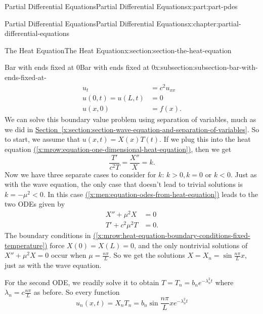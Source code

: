 \documentclass[twoside,10pt,]{book}
\newcommand{\xreffont}{\relax}
\numberwithin{equation}{part}
\newcommand{\lt}{<}
\newcommand{\gt}{>}
\newcommand{\amp}{&}
\begin{document}
\begin{partptx}{Partial Differential Equations}{}{Partial Differential Equations}{}{}{x:part:part-pdes}
\begin{chapterptx}{Partial Differential Equations}{}{Partial Differential Equations}{}{}{x:chapter:partial-differential-equations}
\begin{sectionptx}{The Heat Equation}{}{The Heat Equation}{}{}{x:section:section-the-heat-equation}
\begin{subsectionptx}{Bar with ends fixed at \(0\)}{}{Bar with ends fixed at \(0\)}{}{}{x:subsection:subsection-bar-with-ends-fixed-at-}
%
\begin{align}
u_{t} \amp = c^{2}u_{xx} \label{x:mrow:equation-one-dimensional-heat-equation}\\
u(0,t) = u(L,t) \amp = 0 \label{x:mrow:heat-equation-boundary-conditions-fixed-temperature}\\
u(x,0) \amp = f(x) \text{.}\label{x:mrow:heat-equation-initial-condition}
\end{align}
We can solve this boundary value problem using separation of variables, much as we did in \hyperref[x:section:section-wave-equation-and-separation-of-variables]{Section~{\xreffont\ref{x:section:section-wave-equation-and-separation-of-variables}}}. So to start, we assume that \(u(x,t) = X(x)T(t)\). If we plug this into the heat equation \hyperref[x:mrow:equation-one-dimensional-heat-equation]{({\xreffont\ref{x:mrow:equation-one-dimensional-heat-equation}})}, then we get%
%
\begin{equation}
\frac{T'}{c^{2}T} = \frac{X''}{X} = k.\label{x:men:equation-odes-from-heat-equation}
\end{equation}
Now we have three separate cases to consider for \(k\): \(k\gt0, k=0\) or \(k\lt0\). Just as with the wave equation, the only case that doesn't lead to trivial solutions is \(k=-\mu^{2}\lt0\). In this case \hyperref[x:men:equation-odes-from-heat-equation]{({\xreffont\ref{x:men:equation-odes-from-heat-equation}})} leads to the two ODEs given by%
%
\begin{align*}
X''+\mu^{2}X \amp = 0 \\
T'+c^{2}\mu^{2}T \amp = 0 \text{.}
\end{align*}
The boundary conditions in \hyperref[x:mrow:heat-equation-boundary-conditions-fixed-temperature]{({\xreffont\ref{x:mrow:heat-equation-boundary-conditions-fixed-temperature}})} force \(X(0) = X(L) = 0\), and the only nontrivial solutions of \(X''+\mu^{2}X = 0\) occur when \(\mu = \frac{n\pi}{L}\). So we get the solutions \(X = X_{n} = \sin\frac{n\pi}{L}x\), just as with the wave equation.%
\par
For the second ODE, we readily solve it to obtain \(T = T_{n} = b_{n}e^{-\lambda_{n}^{2}t}\) where \(\lambda_{n} = c\frac{n\pi}{L}\) as before. So every function%
\begin{equation*}
u_{n}(x,t) = X_{n}T_{n} = b_{n}\sin\frac{n\pi}{L}xe^{-\lambda_{n}^{2}t}
\end{equation*}

\end{subsectionptx}
\end{sectionptx}
\end{chapterptx}
\end{partptx}
\end{document}
